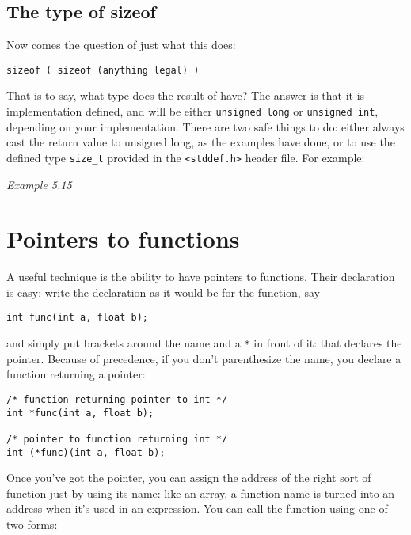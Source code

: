   

  \subsection{The type of sizeof}
   

   Now comes the question of just what this does:


   \begin{Verbatim}
sizeof ( sizeof (anything legal) )
\end{Verbatim}

   That is to say, what type does the result of \sizeof{} have?
    The answer is that it is implementation defined, and will be either
    \texttt{unsigned long} or \texttt{unsigned int}, depending on
    your implementation. There are two safe things to do: either always cast
    the return value to unsigned long, as the examples have done, or to use
    the defined type \texttt{size\_t} provided in the
    \texttt{<stddef.h>} header file. For example:


   \begin{center}\textit{Example 5.15}\end{center}


  

 
        \section{Pointers to functions}
        

  

  A useful technique is the ability to have pointers to functions. Their
   declaration is easy: write the declaration as it would be for the
   function, say


  \begin{Verbatim}
int func(int a, float b);
\end{Verbatim}

  and simply put brackets around the name and a \texttt{*} in front
   of it: that declares the pointer. Because of precedence, if you don't
   parenthesize the name, you declare a function returning a pointer:


  \begin{Verbatim}
/* function returning pointer to int */
int *func(int a, float b);

/* pointer to function returning int */
int (*func)(int a, float b);
\end{Verbatim}

  Once you've got the pointer, you can assign the address of the right
   sort of function just by using its name: like an array, a function name
   is turned into an address when it's used in an expression. You can call
   the function using one of two forms:



